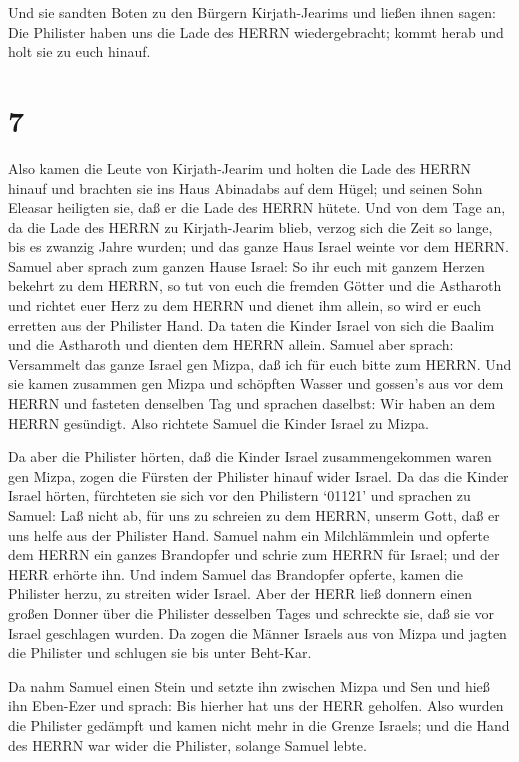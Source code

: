  Und sie sandten Boten zu den Bürgern Kirjath-Jearims und
ließen ihnen sagen: Die Philister haben uns die Lade des HERRN
wiedergebracht; kommt herab und holt sie zu euch hinauf.

\hypertarget{section-6}{%
\section{7}\label{section-6}}

 Also kamen die Leute von Kirjath-Jearim und holten die Lade
des HERRN hinauf und brachten sie ins Haus Abinadabs auf dem Hügel; und
seinen Sohn Eleasar heiligten sie, daß er die Lade des HERRN hütete.
 Und von dem Tage an, da die Lade des HERRN zu
Kirjath-Jearim blieb, verzog sich die Zeit so lange, bis es zwanzig
Jahre wurden; und das ganze Haus Israel weinte vor dem HERRN.
 Samuel aber sprach zum ganzen Hause Israel: So ihr euch mit
ganzem Herzen bekehrt zu dem HERRN, so tut von euch die fremden Götter
und die Astharoth und richtet euer Herz zu dem HERRN und dienet ihm
allein, so wird er euch erretten aus der Philister Hand.  Da
taten die Kinder Israel von sich die Baalim und die Astharoth und
dienten dem HERRN allein.  Samuel aber sprach: Versammelt
das ganze Israel gen Mizpa, daß ich für euch bitte zum HERRN.
 Und sie kamen zusammen gen Mizpa und schöpften Wasser und
gossen's aus vor dem HERRN und fasteten denselben Tag und sprachen
daselbst: Wir haben an dem HERRN gesündigt. Also richtete Samuel die
Kinder Israel zu Mizpa.

 Da aber die Philister hörten, daß die Kinder Israel
zusammengekommen waren gen Mizpa, zogen die Fürsten der Philister hinauf
wider Israel. Da das die Kinder Israel hörten, fürchteten sie sich vor
den Philistern  `01121' und sprachen zu Samuel: Laß nicht
ab, für uns zu schreien zu dem HERRN, unserm Gott, daß er uns helfe aus
der Philister Hand.  Samuel nahm ein Milchlämmlein und
opferte dem HERRN ein ganzes Brandopfer und schrie zum HERRN für Israel;
und der HERR erhörte ihn.  Und indem Samuel das Brandopfer
opferte, kamen die Philister herzu, zu streiten wider Israel. Aber der
HERR ließ donnern einen großen Donner über die Philister desselben Tages
und schreckte sie, daß sie vor Israel geschlagen wurden. 
Da zogen die Männer Israels aus von Mizpa und jagten die Philister und
schlugen sie bis unter Beht-Kar.

 Da nahm Samuel einen Stein und setzte ihn zwischen Mizpa
und Sen und hieß ihn Eben-Ezer und sprach: Bis hierher hat uns der HERR
geholfen.  Also wurden die Philister gedämpft und kamen
nicht mehr in die Grenze Israels; und die Hand des HERRN war wider die
Philister, solange Samuel lebte.

